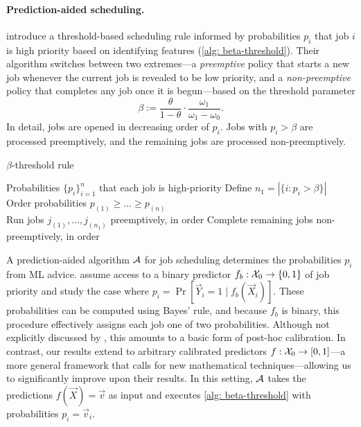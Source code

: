 \paragraph{Prediction-aided scheduling.}
\citet{Cho22:Scheduling} introduce a threshold-based scheduling rule informed by probabilities $p_i$ that job $i$ is high priority based on identifying features (\cref{alg: beta-threshold}). Their algorithm switches between two extremes---a \textit{preemptive} policy that starts a new job whenever the current job is revealed to be low priority, and a \textit{non-preemptive} policy that completes any job once it is begun---based on the threshold parameter \[\beta := \frac{\theta}{1 - \theta} \cdot \frac{\omega_1}{\omega_1 - \omega_0}.\]
In detail, jobs are opened in decreasing order of $p_i$. Jobs with $p_i > \beta$ are processed preemptively, and the remaining jobs are processed non-preemptively.

 \begin{algorithm}[b]
   \caption{$\beta$-threshold rule}
    \label{alg: beta-threshold}
\begin{algorithmic}
   Probabilities $\{p_i\}_{i=1}^n$ that each job is high-priority
   \STATE Define $n_1 = |\{i: p_i > \beta\}|$ \\
   \STATE Order probabilities $p_{(1)} \geq \dots \geq p_{(n)}$\\
   \STATE Run jobs $j_{(1)}, \dots, j_{(n_1)}$ preemptively, in order
   \STATE Complete remaining jobs non-preemptively, in order
\end{algorithmic}
\end{algorithm}

A prediction-aided algorithm $\mathcal{A}$ for job scheduling determines the probabilities $p_i$ from ML advice. \citet{Cho22:Scheduling} assume access to a binary predictor $f_b: \mathcal{X}_0 \to \{0,1\}$ of job priority and study the case where $p_i = \Pr[\vec{Y}_i=1 \mid f_b(\vec{X}_i)]$. These probabilities can be computed using Bayes' rule, and because $f_b$ is binary, this procedure effectively assigns each job one of two probabilities. Although not explicitly discussed by \citet{Cho22:Scheduling}, this amounts to a basic form of post-hoc calibration. In contrast, our results extend to arbitrary calibrated predictors $f: \mathcal{X}_0 \to [0,1]$---a more general framework that calls for new mathematical techniques---allowing us to significantly improve upon their results. In this setting, $\mathcal{A}$ takes the predictions $f(\vec{X})=\vec{v}$ as input and executes \cref{alg: beta-threshold} with probabilities $p_i=\vec{v}_i$.

